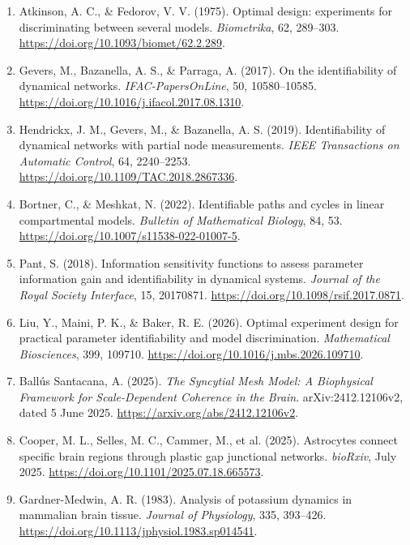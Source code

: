 \documentclass[
  11pt,
]{article}
\begin{document}
\begin{enumerate}
  Raue, A., Kreutz, C., Maiwald, T., Bachmann, J., Schilling, M.,
  Klingmüller, U., \& Timmer, J. (2009). Structural and practical
  identifiability analysis of partially observed dynamical models by
  exploiting the profile likelihood. \emph{Bioinformatics}, 25,
  1923--1929. \url{https://doi.org/10.1093/bioinformatics/btp358}.
\item
  Atkinson, A. C., \& Fedorov, V. V. (1975). Optimal design: experiments
  for discriminating between several models. \emph{Biometrika}, 62,
  289--303. \url{https://doi.org/10.1093/biomet/62.2.289}.
\item
  Gevers, M., Bazanella, A. S., \& Parraga, A. (2017). On the
  identifiability of dynamical networks. \emph{IFAC-PapersOnLine}, 50,
  10580--10585. \url{https://doi.org/10.1016/j.ifacol.2017.08.1310}.
\item
  Hendrickx, J. M., Gevers, M., \& Bazanella, A. S. (2019).
  Identifiability of dynamical networks with partial node measurements.
  \emph{IEEE Transactions on Automatic Control}, 64, 2240--2253.
  \url{https://doi.org/10.1109/TAC.2018.2867336}.
\item
  Bortner, C., \& Meshkat, N. (2022). Identifiable paths and cycles in
  linear compartmental models. \emph{Bulletin of Mathematical Biology},
  84, 53. \url{https://doi.org/10.1007/s11538-022-01007-5}.
\item
  Pant, S. (2018). Information sensitivity functions to assess parameter
  information gain and identifiability in dynamical systems.
  \emph{Journal of the Royal Society Interface}, 15, 20170871.
  \url{https://doi.org/10.1098/rsif.2017.0871}.
\item
  Liu, Y., Maini, P. K., \& Baker, R. E. (2026). Optimal experiment
  design for practical parameter identifiability and model
  discrimination. \emph{Mathematical Biosciences}, 399, 109710.
  \url{https://doi.org/10.1016/j.mbs.2026.109710}.
\item
  Ballús Santacana, A. (2025). \emph{The Syncytial Mesh Model: A Biophysical Framework for Scale-Dependent Coherence in the Brain}. arXiv:2412.12106v2, dated 5 June 2025. \url{https://arxiv.org/abs/2412.12106v2}.
\item
  Cooper, M. L., Selles, M. C., Cammer, M., et al. (2025). Astrocytes connect specific brain regions through plastic gap junctional networks. \emph{bioRxiv}, July 2025. \url{https://doi.org/10.1101/2025.07.18.665573}.
\item
  Gardner-Medwin, A. R. (1983). Analysis of potassium dynamics in mammalian brain tissue. \emph{Journal of Physiology}, 335, 393--426. \url{https://doi.org/10.1113/jphysiol.1983.sp014541}.

\end{enumerate}
\end{document}
